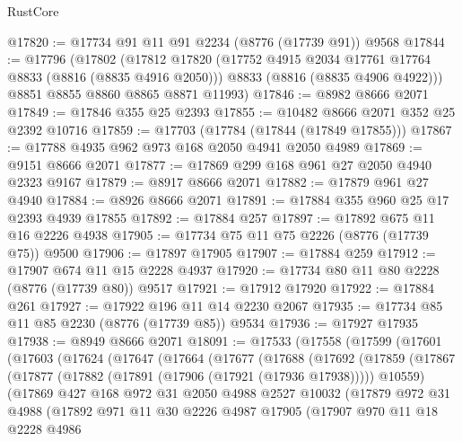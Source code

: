 \begin{lexlean}{RustCore}
\begin{coremodule}
@17820 := @17734 @91 @11 @91 @2234 (@8776 (@17739 @91)) @9568
@17844 := @17796
    (@17802
      (@17812
        @17820
        (@17752 @4915 @2034 @17761 @17764 @8833 (@8816 (@8835 @4916 @2050)))
        @8833
        (@8816 (@8835 @4906 @4922)))
      @8851
      @8855
      @8860
      @8865
      @8871
      @11993)
@17846 := @8982 @8666 @2071
@17849 := @17846 @355 @25 @2393
@17855 := @10482 @8666 @2071 @352 @25 @2392 @10716
@17859 := @17703 (@17784 (@17844 (@17849 @17855)))
@17867 := @17788 @4935 @962 @973 @168 @2050 @4941 @2050 @4989
@17869 := @9151 @8666 @2071
@17877 := @17869 @299 @168 @961 @27 @2050 @4940 @2323 @9167
@17879 := @8917 @8666 @2071
@17882 := @17879 @961 @27 @4940
@17884 := @8926 @8666 @2071
@17891 := @17884 @355 @960 @25 @17 @2393 @4939 @17855
@17892 := @17884 @257
@17897 := @17892 @675 @11 @16 @2226 @4938
@17905 := @17734 @75 @11 @75 @2226 (@8776 (@17739 @75)) @9500
@17906 := @17897 @17905
@17907 := @17884 @259
@17912 := @17907 @674 @11 @15 @2228 @4937
@17920 := @17734 @80 @11 @80 @2228 (@8776 (@17739 @80)) @9517
@17921 := @17912 @17920
@17922 := @17884 @261
@17927 := @17922 @196 @11 @14 @2230 @2067
@17935 := @17734 @85 @11 @85 @2230 (@8776 (@17739 @85)) @9534
@17936 := @17927 @17935
@17938 := @8949 @8666 @2071
@18091 := @17533
    (@17558
      (@17599
        (@17601
          (@17603
            (@17624
              (@17647
                (@17664
                  (@17677
                    (@17688
                      (@17692
                        (@17859
                          (@17867
                            (@17877 (@17882 (@17891 (@17906 (@17921 (@17936 @17938))))) @10559)
                            (@17869
                              @427
                              @168
                              @972
                              @31
                              @2050
                              @4988
                              @2527
                              @10032
                              (@17879
                                @972
                                @31
                                @4988
                                (@17892
                                  @971
                                  @11
                                  @30
                                  @2226
                                  @4987
                                  @17905
                                  (@17907
                                    @970
                                    @11
                                    @18
                                    @2228
                                    @4986

\end{coremodule}
\end{lexlean}
